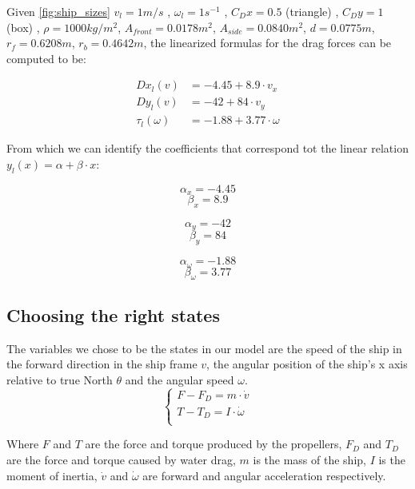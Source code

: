 Given \vref{fig:ship_sizes}
 $ v_{l} = 1m/s $ ,
 $ \omega_{l} = 1 s ^{-1} $ ,
 $ C_{D}x = 0.5 $ (triangle) ,
 $ C_{D}y = 1 $ (box) ,
 $ \rho = 1000 kg/m ^{2} $,
 $ A_{front} = 0.0178 m^{2} $,
 $ A_{side} = 0.0840 m ^{2} $,
 $ d = 0.0775 m $,
 $ r_{f} = 0.6208 m $,
 $ r_{b} = 0.4642 m $,
the linearized formulas for the drag forces can be computed to be:


\begin{align}
 Dx_{l}(v) &= -4.45 + 8.9 \cdot v_{x} \\
 Dy_{l}(v) &= -42 + 84 \cdot v_{y} \\
 \tau_{l}(\omega) &= -1.88 + 3.77 \cdot \omega
\end{align}

From which we can identify the coefficients that correspond tot the linear relation $ y_{l}(x) = \alpha + \beta \cdot x $:\\
\begin{minipage}{0.3\linewidth}
\[ \alpha_{x} = -4.45 \] 
\[ \beta_{x} = 8.9 \]
\end{minipage}
\begin{minipage}{0.3\linewidth}
\[ \alpha_{y} = -42 \] 
\[ \beta_{y} = 84 \]
\end{minipage}
\begin{minipage}{0.3\linewidth}
\[ \alpha_{\omega} = -1.88 \]
\[ \beta_{\omega} = 3.77 \]
\end{minipage}


\subsection{Choosing the right states}

The variables we chose to be the states in our model are the speed of the ship in the forward direction in the ship frame $v$, the angular position of the ship's x axis relative to true North $\theta$ and the angular speed $\omega$.\\
\[\begin{cases}
F - F_{D} = m \cdot \dot{v}\\
T - T_{D} = I \cdot \dot{\omega}\\
\end{cases}\]

Where $ F $ and $ T $ are the force and torque produced by the propellers, $ F_{D} $ and $ T_{D} $ are the force and torque caused by water drag, $ m $ is the mass of the ship, $ I $ is the moment of inertia, $ \dot{v} $  and $ \dot{\omega} $ are forward and angular acceleration respectively.

